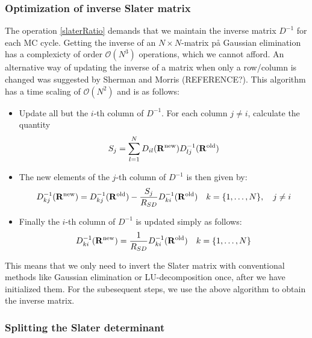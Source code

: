 \documentclass[english, a4paper]{article}
\begin{document}
\noindent 

\subsubsection{Optimization of inverse Slater matrix}
\noindent The operation \eqref{slaterRatio} demands that we maintain the inverse matrix $D^{-1}$ for each
MC cycle. Getting the inverse of an $N\times N$-matrix på Gaussian elimination has a complexicty of order
$\mathcal{O}(N^3)$ operations, which we cannot afford. An alternative way of updating the inverse
of a matrix when only a row/column is changed was suggested by Sherman and Morris (REFERENCE?). 
This algorithm has a time scaling
of $\mathcal{O}(N^2)$ and is as follows:
\begin{itemize}
 \item Update all but the $i$-th column of $D^{-1}$. For each column $j\neq i$,
 calculate the quantity 
 $$S_j = \sum_{l=1}^N D_{il} ({\bf R}^{\textrm{new}}) D_{lj}^{-1} ({\bf R}^{\textrm{old}})$$
 \item The new elements of the $j$-th column of $D^{-1}$ is then given by: 
 $$D_{kj}^{-1}({\bf R}^{\textrm{new}}) = D_{kj}^{-1}({\bf R}^{\textrm{old}}) - \frac{S_j}{R_{SD}}
 D_{ki}^{-1}({\bf R}^{\textrm{old}}) \quad k = \{1,\dots,N\}, \quad j \neq i$$
 \item Finally the $i$-th column of $D^{-1}$ is updated simply as follows:
 $$D_{ki}^{-1}({\bf R}^{\textrm{new}}) = \frac{1}{R_{SD}} D_{ki}^{-1}({\bf R}^{\textrm{old}}) \quad
 k = \{1,\dots,N\}$$
\end{itemize}
This means that we only need to invert the Slater matrix with conventional methods like
Gaussian elimination or LU-decomposition once, after we have initialized them. For the subesequent steps,
we use the above algorithm to obtain the inverse matrix. 

\subsubsection{Splitting the Slater determinant}
\end{document}
